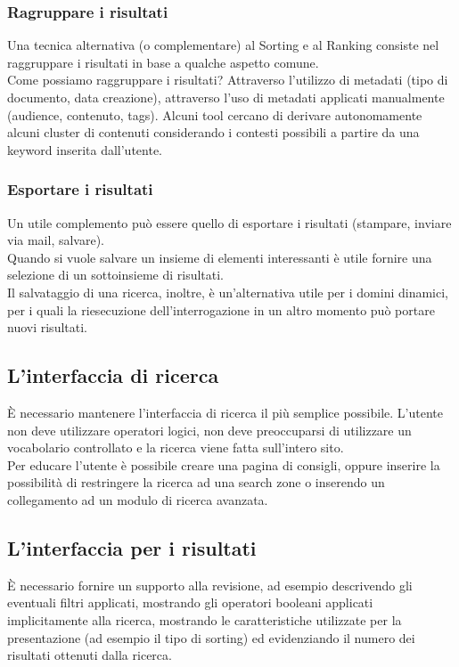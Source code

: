 \documentclass{article}
\begin{document}
\subsubsection{Ragruppare i risultati}
Una tecnica alternativa (o complementare) al Sorting e al Ranking consiste nel raggruppare i risultati in base a qualche aspetto comune.\\
Come possiamo raggruppare i risultati? Attraverso l'utilizzo di metadati (tipo di documento, data creazione), attraverso l'uso di metadati applicati manualmente (audience, contenuto, tags). Alcuni tool cercano di derivare autonomamente alcuni cluster di contenuti considerando i contesti possibili a partire da una keyword inserita dall'utente.
\subsubsection{Esportare i risultati}
Un utile complemento può essere quello di esportare i risultati (stampare, inviare via mail, salvare).\\
Quando si vuole salvare un insieme di elementi interessanti è utile fornire una selezione di un sottoinsieme di risultati.\\
Il salvataggio di una ricerca, inoltre, è un'alternativa utile per i domini dinamici, per i quali la riesecuzione dell'interrogazione in un altro momento può portare nuovi risultati.
\subsection{L'interfaccia di ricerca}
È necessario mantenere l'interfaccia di ricerca il più semplice possibile. L'utente non deve utilizzare operatori logici, non deve preoccuparsi di utilizzare un vocabolario controllato e la ricerca viene fatta sull'intero sito.\\
Per educare l'utente è possibile creare una pagina di consigli, oppure inserire la possibilità di restringere la ricerca ad una search zone o inserendo un collegamento ad un modulo di ricerca avanzata.
\subsection{L'interfaccia per i risultati}
È necessario fornire un supporto alla revisione, ad esempio descrivendo gli eventuali filtri applicati, mostrando gli operatori booleani applicati implicitamente alla ricerca, mostrando le caratteristiche utilizzate per la presentazione (ad esempio il tipo di sorting) ed evidenziando il numero dei risultati ottenuti dalla ricerca.
\end{document}

